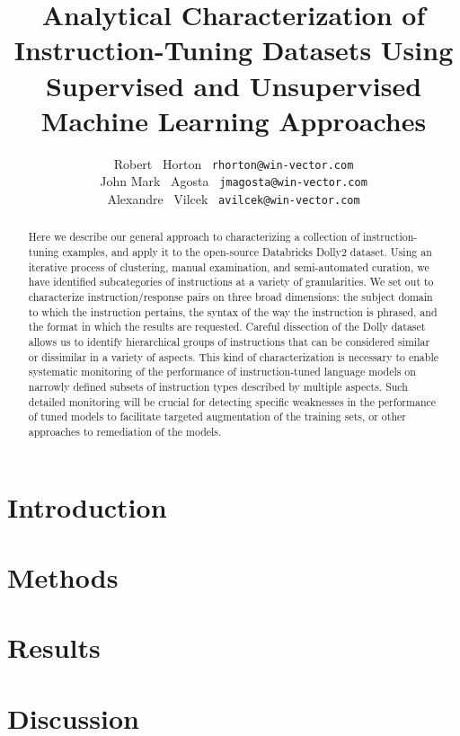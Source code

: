 \documentclass{article}
\title{Analytical Characterization of Instruction-Tuning Datasets Using Supervised and Unsupervised Machine Learning Approaches}
\author{%
  Robert ~Horton~
  \texttt{rhorton@win-vector.com} \\
\And
  John Mark ~Agosta~
  \texttt{jmagosta@win-vector.com} \\
\And
Alexandre ~Vilcek~
  \texttt{avilcek@win-vector.com} \\
}
\begin{document}
\maketitle

\begin{abstract}

Here we describe our general approach to characterizing a collection of instruction-tuning examples, and apply it to the open-source Databricks Dolly2 dataset. Using an iterative process of clustering, manual examination, and semi-automated curation, we have identified subcategories of instructions at a variety of granularities. We set out to characterize instruction/response pairs on three broad dimensions: the subject domain to which the instruction pertains, the syntax of the way the instruction is phrased, and the format in which the results are requested. Careful dissection of the Dolly dataset allows us to identify hierarchical groups of instructions that can be considered similar or dissimilar in a variety of aspects. This kind of characterization is necessary to enable systematic monitoring of the performance of instruction-tuned language models on narrowly defined subsets of instruction types described by multiple aspects. Such detailed monitoring will be crucial for detecting specific weaknesses in the performance of tuned models to facilitate targeted augmentation of the training sets, or other approaches to remediation of the models.

\end{abstract}

\section{Introduction}
\label{sec:introduction}


\section{Methods}
\label{sec:methods}


\section{Results}
\label{sec:results}


\section{Discussion}
\label{sec:discussion}








\end{document}
